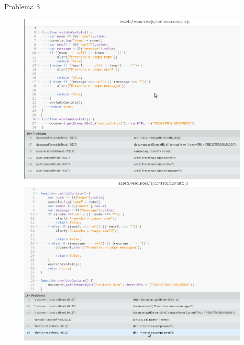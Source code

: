 Problema 3
\begin{figure}[!htb]
\setcounter{figure}{0}
\centering
\begin{minipage}{.5\textwidth}
  \centering
  \includegraphics[width=.9\linewidth]{./img/hint3.png}
\end{minipage}%
\begin{minipage}{.5\textwidth}
  \centering
  \includegraphics[width=.7\linewidth]{./img/hint3-arrumado.png}
\end{minipage}
\end{figure}

